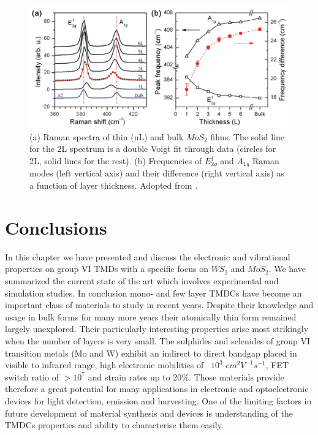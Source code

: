 \begin{figure}[h]
	\begin{center}
		\includegraphics[scale=0.3]{NumberLayerIdentificationRamanMoS2.png}
		\caption{(a) Raman spectra of thin (nL) and bulk $MoS_2$ films. The solid line for the 2L spectrum is a double Voigt fit through data (circles for 2L, solid lines for the rest). (b) Frequencies of $E^1_{2g}$ and $A_{1g}$ Raman modes (left vertical axis) and their difference (right vertical axis) as a function of layer thickness. Adopted from \cite{Lee2010}.}
		\label{fig:NumberLayerIdentificationRamanMoS2}
	\end{center}
\end{figure}

\section{Conclusions}

In this chapter we have presented and discuss the electronic and vibrational properties on group VI TMDs with a specific focus on $WS_2$ and $MoS_2$. We have summarized the current state of the art which involves experimental and simulation studies. In conclusion mono- and few layer TMDCs have become an important class of materials to study in recent years. Despite their knowledge and usage in bulk forms for many more years their atomically thin form remained largely unexplored. Their particularly interesting properties arise most strikingly when the number of layers is very small. The sulphides and selenides of group VI transition metals  (Mo and W) exhibit an indirect to direct bandgap placed in visible to infrared range, high electronic mobilities of ~$10^3$ $cm^2 V^{-1} s^{-1}$, FET switch ratio of $>10^7$ and strain rates up to 20{\%}. Those materials provide therefore a great potential for many applications in electronic and optoelectronic devices for light detection, emission and harvesting. One of the limiting factors in future development of material synthesis and devices is understanding of the TMDCs properties and ability to characterise them easily.